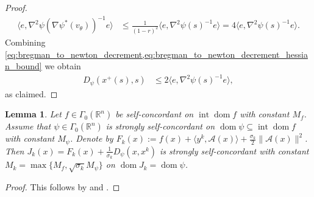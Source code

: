 \documentclass[11pt,onecolumn]{article}
\DeclareMathOperator{\dom}{dom}
\DeclareMathOperator{\intr}{int}
\newcommand{\bR}{\mathbb{R}}
\newtheorem{lemma}[lemma]{Lemma}
\theoremstyle{remark}
\begin{document}
\begin{proof}
\begin{align}  \label{eq:bregman_to_newton_decrement_hessian_bound}
\langle e, \nabla^2 \psi(\nabla \psi^*(v_\theta))^{-1} e \rangle &\leq \tfrac{1}{(1-r)^2}\langle e, \nabla^2 \psi(s)^{-1} e\rangle =4 \langle e, \nabla^2 \psi(s)^{-1} e \rangle.
\end{align}
Combining \cref{eq:bregman_to_newton_decrement,eq:bregman_to_newton_decrement_hessian_bound} we obtain
\begin{align}
D_\psi(x^{+}(s), s)&\leq 2 \langle e, \nabla^2 \psi(s)^{-1} e \rangle,
\end{align}
as claimed.
\end{proof}

\begin{lemma} \label{thm:sc}
Let $f\in \Gamma_0(\bR^n)$ be self-concordant on $\intr \dom f$ with constant $M_f$. Assume that $\psi\in \Gamma_0(\bR^n)$ is strongly self-concordant on $\dom \psi\subseteq \intr \dom f$ with constant $M_\psi$. Denote by $F_k(x):=f(x)+\langle y^k, \mathcal{A}(x)\rangle + \frac{\sigma_k}{2} \|\mathcal{A}(x)\|^2$. Then $J_k(x)=F_k(x)+\frac{1}{\sigma_k}D_\psi(x, x^k)$ is strongly self-concordant with constant $M_k=\max\{M_f, \sqrt{\sigma_k}M_\psi \}$ on $\dom J_k = \dom \psi$.
\end{lemma}
\begin{proof}
This follows by \cite[Theorem 5.1.1]{nesterov2018lectures} and \cite[Corollary 5.1.2]{nesterov2018lectures}.
\end{proof}
\end{document}
